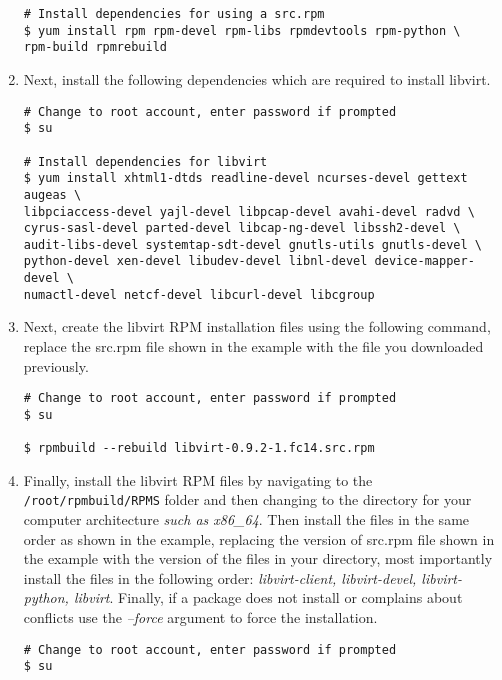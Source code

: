 \begin{enumerate}
\begin{lstlisting}
# Install dependencies for using a src.rpm
$ yum install rpm rpm-devel rpm-libs rpmdevtools rpm-python \
rpm-build rpmrebuild
\end{lstlisting}

\item	Next, install the following dependencies which are required to install libvirt.

\lstset{language=bash,caption=Install libvirt Dependencies}
\begin{lstlisting}
# Change to root account, enter password if prompted
$ su

# Install dependencies for libvirt
$ yum install xhtml1-dtds readline-devel ncurses-devel gettext augeas \
libpciaccess-devel yajl-devel libpcap-devel avahi-devel radvd \
cyrus-sasl-devel parted-devel libcap-ng-devel libssh2-devel \
audit-libs-devel systemtap-sdt-devel gnutls-utils gnutls-devel \
python-devel xen-devel libudev-devel libnl-devel device-mapper-devel \
numactl-devel netcf-devel libcurl-devel libcgroup
\end{lstlisting}
	
\item 	Next, create the libvirt RPM installation files using the following command, replace the src.rpm file
		shown in the example with the file you downloaded previously.

\lstset{language=bash,caption=Create libvirt RPM Files}
\begin{lstlisting}
# Change to root account, enter password if prompted
$ su

$ rpmbuild --rebuild libvirt-0.9.2-1.fc14.src.rpm
\end{lstlisting}

\item	Finally, install the libvirt RPM files by navigating to the \verb|/root/rpmbuild/RPMS| folder and
		then changing to the directory for your computer architecture \emph{such as x86\_64}. Then install
		the files in the same order as shown in the example, replacing the version of src.rpm file shown in 
		the example	with the version of the files in your directory, most importantly install the files
		in the following order: \emph{libvirt-client, libvirt-devel, libvirt-python, libvirt}. Finally,
		if a package does not install or complains about conflicts use the \emph{--force} argument to
		force the installation.

\lstset{language=bash,caption=Install libvirt}
\begin{lstlisting}
# Change to root account, enter password if prompted
$ su


\end{lstlisting}
\end{enumerate}
